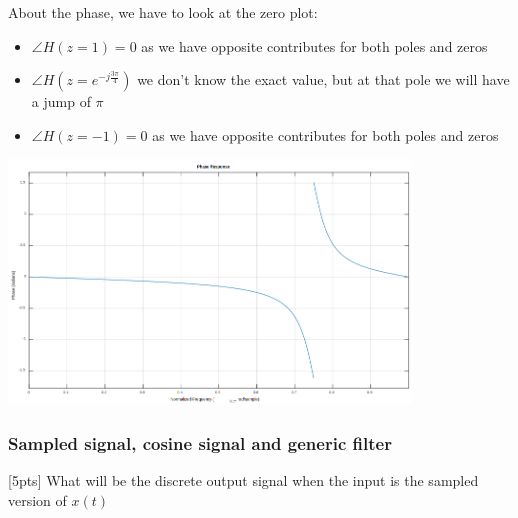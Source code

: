 {        About the phase, we have to look at the zero plot:
        \begin{itemize}
            \item $\angle H(z=1)=0$ as we have opposite contributes for both poles and zeros
            \item $\angle H(z=e^{-j\frac{3\pi}{4}})$ we don't know the exact value, but at that pole we will have a jump of $\pi$
            \item $\angle H(z=-1)=0$ as we have opposite contributes for both poles and zeros
        \end{itemize}
        \begin{center}
            \includegraphics[width=0.8\textwidth]{images/20181107_13.png}
        \end{center}
    }

    \subsubsection{Sampled signal, cosine signal and generic filter}
    [5pts] What will be the discrete output signal when the input is the sampled version of $x(t)$

